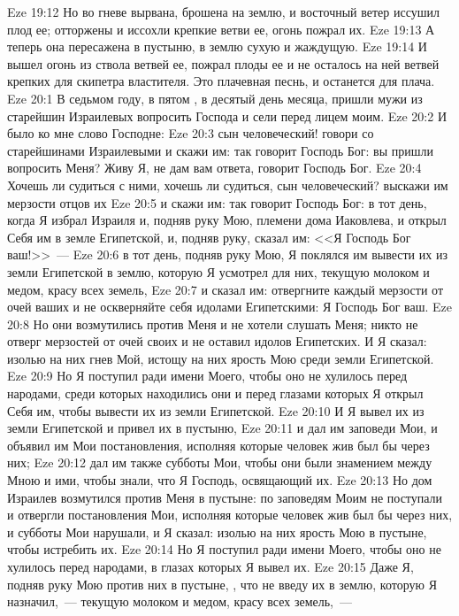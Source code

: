 \vs Eze 19:12 Но во гневе вырвана, брошена на землю, и восточный ветер иссушил плод ее; отторжены и иссохли крепкие ветви ее, огонь пожрал их.
\vs Eze 19:13 А теперь она пересажена в пустыню, в землю сухую и жаждущую.
\vs Eze 19:14 И вышел огонь из ствола ветвей ее, пожрал плоды ее и не осталось на ней ветвей крепких для скипетра властителя. Это плачевная песнь, и останется для плача.
\vs Eze 20:1 В седьмом году, в пятом , в десятый день месяца, пришли мужи из старейшин Израилевых вопросить Господа и сели перед лицем моим.
\vs Eze 20:2 И было ко мне слово Господне:
\vs Eze 20:3 сын человеческий! говори со старейшинами Израилевыми и скажи им: так говорит Господь Бог: вы пришли вопросить Меня? Живу Я, не дам вам ответа, говорит Господь Бог.
\vs Eze 20:4 Хочешь ли судиться с ними, хочешь ли судиться, сын человеческий? выскажи им мерзости отцов их
\vs Eze 20:5 и скажи им: так говорит Господь Бог: в тот день, когда Я избрал Израиля и, подняв руку Мою,  племени дома Иаковлева, и открыл Себя им в земле Египетской, и, подняв руку, сказал им: <<Я Господь Бог ваш!>>~---
\vs Eze 20:6 в тот день, подняв руку Мою, Я поклялся им вывести их из земли Египетской в землю, которую Я усмотрел для них, текущую молоком и медом, красу всех земель,
\vs Eze 20:7 и сказал им: отвергните каждый мерзости от очей ваших и не оскверняйте себя идолами Египетскими: Я Господь Бог ваш.
\vs Eze 20:8 Но они возмутились против Меня и не хотели слушать Меня; никто не отверг мерзостей от очей своих и не оставил идолов Египетских. И Я сказал: изолью на них гнев Мой, истощу на них ярость Мою среди земли Египетской.
\vs Eze 20:9 Но Я поступил ради имени Моего, чтобы оно не хулилось перед народами, среди которых находились они и перед глазами которых Я открыл Себя им, чтобы вывести их из земли Египетской.
\vs Eze 20:10 И Я вывел их из земли Египетской и привел их в пустыню,
\vs Eze 20:11 и дал им заповеди Мои, и объявил им Мои постановления, исполняя которые человек жив был бы через них;
\vs Eze 20:12 дал им также субботы Мои, чтобы они были знамением между Мною и ими, чтобы знали, что Я Господь, освящающий их.
\vs Eze 20:13 Но дом Израилев возмутился против Меня в пустыне: по заповедям Моим не поступали и отвергли постановления Мои, исполняя которые человек жив был бы через них, и субботы Мои нарушали, и Я сказал: изолью на них ярость Мою в пустыне, чтобы истребить их.
\vs Eze 20:14 Но Я поступил ради имени Моего, чтобы оно не хулилось перед народами, в глазах которых Я вывел их.
\vs Eze 20:15 Даже Я, подняв руку Мою против них в пустыне, , что не введу их в землю, которую Я назначил,~--- текущую молоком и медом, красу всех земель,~---
